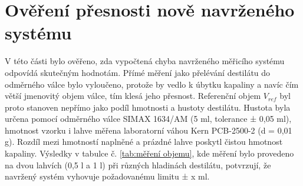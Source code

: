 \section{Ověření přesnosti nově navrženého systému}

V této části bylo ověřeno, zda vypočtená chyba navrženého měřicího systému odpovídá skutečným hodnotám. Přímé měření jako přelévání destilátu do odměrného válce bylo vyloučeno, protože by vedlo k úbytku kapaliny a navíc čím větší jmenovitý objem válce, tím klesá jeho přesnost. Referenční objem $V_{ref}$ byl proto stanoven nepřímo jako podíl hmotnosti a hustoty destilátu. Hustota byla určena pomocí odměrného válce SIMAX 1634/AM (5 ml, tolerance ± 0,05 ml), hmotnost vzorku i lahve měřena laboratorní váhou Kern PCB-2500-2 (d = 0,01 g). Rozdíl mezi hmotností naplněné a prázdné lahve poskytl čistou hmotnost kapaliny. Výsledky v tabulce č. \ref{tab:měření objemu}, kde měření bylo provedeno na dvou lahvích (0,5 l a 1 l) při různých hladinách destilátu, potvrzují, že navržený systém vyhovuje požadovanému limitu ± x ml.





